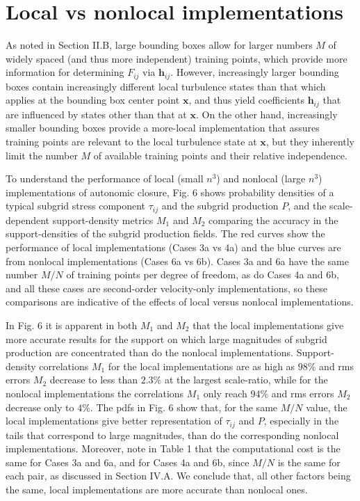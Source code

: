 \section{Local vs nonlocal implementations} 

As noted in Section II.B, large bounding boxes allow for larger numbers $M$ of widely spaced (and thus more independent) training points, which provide more information for determining $F_{ij}$  via $\mathbf{h}_{ij}$. However, increasingly larger bounding boxes contain increasingly different local turbulence states than that which applies at the bounding box center point $\mathbf{x}$, and thus yield coefficients $\mathbf{h}_{ij}$  that are influenced by states other than that at $\mathbf{x}$. On the other hand, increasingly smaller bounding boxes provide a more-local implementation that assures training points are relevant to the local turbulence state at $\mathbf{x}$, but they inherently limit the number $M$ of available training points and their relative independence.  

To understand the performance of local (small $n^3$) and nonlocal (large $n^3$) implementations of autonomic closure, Fig. 6 shows probability densities of a typical subgrid stress component  $\tau_{ij}$ and the subgrid production $P$, and the scale-dependent support-density metrics $M_1$ and $M_2$  comparing the accuracy in the support-densities of the subgrid production fields. The red curves show the performance of local implementations (Cases 3a vs 4a) and the blue curves are from nonlocal implementations (Cases 6a vs 6b). Cases 3a and 6a have the same number $M/N$  of training points per degree of freedom, as do Cases 4a and 6b, and all these cases are second-order velocity-only implementations, so these comparisons are indicative of the effects of local versus nonlocal implementations. 

In Fig. 6 it is apparent in both $M_1$  and $M_2$  that the local implementations give more accurate results for the support on which large magnitudes of subgrid production are concentrated than do the nonlocal implementations. Support-density correlations $M_1$ for the local implementations are as high as $98\%$ and rms errors $M_2$  decrease to less than $2.3\%$  at the largest scale-ratio, while for the nonlocal implementations the correlations $M_1$  only reach $94\%$ and rms errors $M_2$  decrease only to $4\%$. The pdfs in Fig. 6 show that, for the same $M/N$  value, the local implementations give better representation of  $\tau_{ij}$ and $P$, especially in the tails that correspond to large magnitudes, than do the corresponding nonlocal implementations. Moreover, note in Table 1 that the computational cost is the same for Cases 3a and 6a, and for Cases 4a and 6b, since  $M/N$ is the same for each pair, as discussed in Section IV.A. We conclude that, all other factors being the same, local implementations are more accurate than nonlocal ones. 

